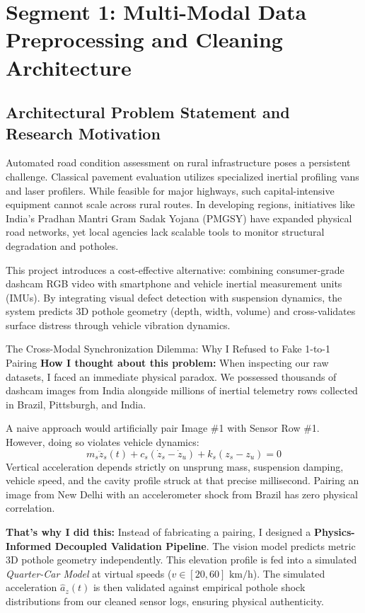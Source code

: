 
\section{Segment 1: Multi-Modal Data Preprocessing and Cleaning Architecture}

\subsection{Architectural Problem Statement and Research Motivation}
Automated road condition assessment on rural infrastructure poses a persistent challenge. Classical pavement evaluation utilizes specialized inertial profiling vans and laser profilers. While feasible for major highways, such capital-intensive equipment cannot scale across rural routes. In developing regions, initiatives like India's Pradhan Mantri Gram Sadak Yojana (PMGSY) have expanded physical road networks, yet local agencies lack scalable tools to monitor structural degradation and potholes.

This project introduces a cost-effective alternative: combining consumer-grade dashcam RGB video with smartphone and vehicle inertial measurement units (IMUs). By integrating visual defect detection with suspension dynamics, the system predicts 3D pothole geometry (depth, width, volume) and cross-validates surface distress through vehicle vibration dynamics.

\begin{designreflection}{The Cross-Modal Synchronization Dilemma: Why I Refused to Fake 1-to-1 Pairing}
\textbf{How I thought about this problem:}
When inspecting our raw datasets, I faced an immediate physical paradox. We possessed thousands of dashcam images from India alongside millions of inertial telemetry rows collected in Brazil, Pittsburgh, and India.

A naive approach would artificially pair Image \#1 with Sensor Row \#1. However, doing so violates vehicle dynamics:
\begin{equation}
m_s \ddot{z}_s(t) + c_s (\dot{z}_s - \dot{z}_u) + k_s (z_s - z_u) = 0
\end{equation}
Vertical acceleration depends strictly on unsprung mass, suspension damping, vehicle speed, and the cavity profile struck at that precise millisecond. Pairing an image from New Delhi with an accelerometer shock from Brazil has zero physical correlation.

\textbf{That's why I did this:}
Instead of fabricating a pairing, I designed a \textbf{Physics-Informed Decoupled Validation Pipeline}. The vision model predicts metric 3D pothole geometry independently. This elevation profile is fed into a simulated \textit{Quarter-Car Model} at virtual speeds ($v \in [20, 60]\text{ km/h}$). The simulated acceleration $\hat{a}_z(t)$ is then validated against empirical pothole shock distributions from our cleaned sensor logs, ensuring physical authenticity.
\end{designreflection}

